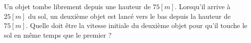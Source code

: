 \begin{exercise}
  Un objet tombe librement depuis une hauteur de \(75\unit{[m]}\). Lorsqu'il arrive à \(25 \unit{[m]}\) du sol, un deuxième objet est lancé vers le bas depuis la hauteur de \(75\unit{[m]}\). Quelle doit être la vitesse initiale du deuxième objet pour qu'il touche le sol en même temps que le premier ?
\end{exercise}

\begin{exercise}
\end{exercise}